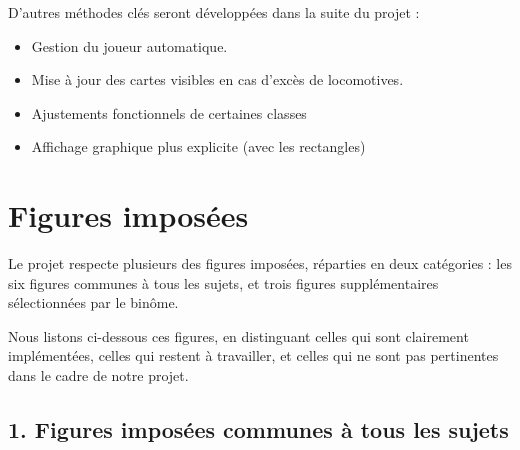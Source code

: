 \documentclass[a4paper,12pt]{report}
\begin{document}
D'autres méthodes clés seront développées dans la suite du projet :
\begin{itemize}
    \item Gestion du joueur automatique.
    \item Mise à jour des cartes visibles en cas d'excès de locomotives.
    \item Ajustements fonctionnels de certaines classes
    \item Affichage graphique plus explicite (avec les rectangles)
\end{itemize}

\chapter{Figures imposées}

Le projet respecte plusieurs des figures imposées, réparties en deux catégories :
les six figures communes à tous les sujets, et trois figures supplémentaires sélectionnées par le binôme.

Nous listons ci-dessous ces figures, en distinguant celles qui sont clairement implémentées,
celles qui restent à travailler, et celles qui ne sont pas pertinentes dans le cadre de notre projet.

\section*{1. Figures imposées communes à tous les sujets}
\end{document}
